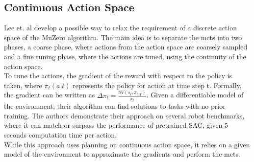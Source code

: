 \subsection{Continuous Action Space}
\label{sec:mctsca}
Lee et. al \cite{Lee_Jeon_Kim_Kim_2020} develop a possible way to relax the requirement of a discrete action space of the MuZero algorithm. 
The main idea is to separate 
the \ac{mcts} into two phases, a coarse phase, where actions from the action space are coarsely sampled and a fine tuning phase, where the actions are tuned, using the continuity of the action space.\\
To tune the actions, the gradient of the reward with respect to the policy is taken, where $\pi_t(a|t)$ represents the policy for action at time step t. 
Formally, the gradient can be written as $\Delta \pi_t = \frac{\partial V (s_t, \pi_{t:T})}{\pi_{t}}$. Given a differentiable model of the environment, their algorithm can 
find solutions to tasks with no prior training. The authors demonstrate their approach on several robot 
benchmarks, where it can match or surpass the performance of pretrained SAC, given 5 seconds computation time per action.\\
While this approach uses planning on continuous action space, it relies on a given model of the environment to approximate the gradients and perform the \ac{mcts}.